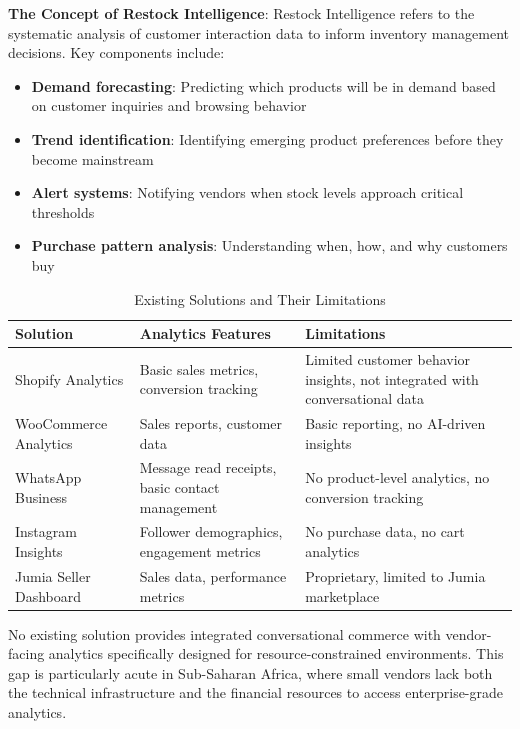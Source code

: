 \documentclass[12pt,a4paper]{article}
\begin{document}
\textbf{The Concept of Restock Intelligence}: Restock Intelligence refers to the systematic analysis of customer interaction data to inform inventory management decisions. Key components include:

\begin{itemize}
    \item \textbf{Demand forecasting}: Predicting which products will be in demand based on customer inquiries and browsing behavior
    \item \textbf{Trend identification}: Identifying emerging product preferences before they become mainstream
    \item \textbf{Alert systems}: Notifying vendors when stock levels approach critical thresholds
    \item \textbf{Purchase pattern analysis}: Understanding when, how, and why customers buy
\end{itemize}

\begin{table}[h]
\centering
\caption{Existing Solutions and Their Limitations}
\label{tab:existing_solutions}
\begin{tabular}{p{4cm}p{5cm}p{5cm}}
\toprule
\textbf{Solution} & \textbf{Analytics Features} & \textbf{Limitations} \\
\midrule
Shopify Analytics & Basic sales metrics, conversion tracking & Limited customer behavior insights, not integrated with conversational data \\
WooCommerce Analytics & Sales reports, customer data & Basic reporting, no AI-driven insights \\
WhatsApp Business & Message read receipts, basic contact management & No product-level analytics, no conversion tracking \\
Instagram Insights & Follower demographics, engagement metrics & No purchase data, no cart analytics \\
Jumia Seller Dashboard & Sales data, performance metrics & Proprietary, limited to Jumia marketplace \\
\bottomrule
\end{tabular}
\end{table}

No existing solution provides integrated conversational commerce with vendor-facing analytics specifically designed for resource-constrained environments. This gap is particularly acute in Sub-Saharan Africa, where small vendors lack both the technical infrastructure and the financial resources to access enterprise-grade analytics.
\end{document}
